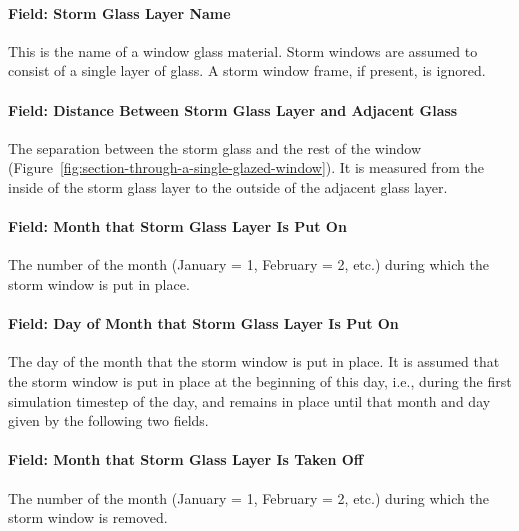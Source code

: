 \paragraph{Field: Storm Glass Layer Name}\label{field-storm-glass-layer-name}

This is the name of a window glass material. Storm windows are assumed to consist of a single layer of glass. A storm window frame, if present, is ignored.

\paragraph{Field: Distance Between Storm Glass Layer and Adjacent Glass}\label{field-distance-between-storm-glass-layer-and-adjacent-glass}

The separation between the storm glass and the rest of the window (Figure~\ref{fig:section-through-a-single-glazed-window}). It is measured from the inside of the storm glass layer to the outside of the adjacent glass layer.

\paragraph{Field: Month that Storm Glass Layer Is Put On}\label{field-month-that-storm-glass-layer-is-put-on}

The number of the month (January = 1, February = 2, etc.) during which the storm window is put in place.

\paragraph{Field: Day of Month that Storm Glass Layer Is Put On}\label{field-day-of-month-that-storm-glass-layer-is-put-on}

The day of the month that the storm window is put in place. It is assumed that the storm window is put in place at the beginning of this day, i.e., during the first simulation timestep of the day, and remains in place until that month and day given by the following two fields.

\paragraph{Field: Month that Storm Glass Layer Is Taken Off}\label{field-month-that-storm-glass-layer-is-taken-off}

The number of the month (January = 1, February = 2, etc.) during which the storm window is removed.

